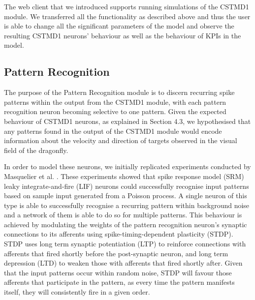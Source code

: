 \documentclass[a4paper,11pt]{article}
\begin{document}
The web client that we introduced supports running simulations of the CSTMD1 module. We transferred all the functionality as described above and thus the user is able to change all the significant parameters of the model and observe the resulting CSTMD1 neurons' behaviour as well as the behaviour of KPIs in the model.

\subsection{Pattern Recognition}

The purpose of the Pattern Recognition module is to discern recurring spike patterns within the output from the CSTMD1 module, with each pattern recognition neuron becoming selective to one pattern. Given the expected behaviour of CSTMD1 neurons, as explained in Section 4.3, we hypothesised that any patterns found in the output of the CSTMD1 module would encode information about the velocity and direction of targets observed in the visual field of the dragonfly.\par

	In order to model these neurons, we initially replicated experiments conducted by Masquelier et al. \cite{stdp2} \cite{stdp1}. These experiments showed that spike response model (SRM) leaky integrate-and-fire (LIF) neurons could successfully recognise input patterns based on sample input generated from a Poisson process. A single neuron of this type is able to successfully recognise a recurring pattern within background noise and a network of them is able to do so for multiple patterns. This behaviour is achieved by modulating the weights of the pattern recognition neuron's synaptic connections to its afferents using spike-timing-dependent plasticity (STDP). STDP uses long term synaptic potentiation (LTP) to reinforce connections with afferents that fired shortly before the post-synaptic neuron, and long term depression (LTD) to weaken those with afferents that fired shortly after. Given that the input patterns occur within random noise, STDP will favour those afferents that participate in the pattern, as every time the pattern manifests itself, they will consistently fire in a given order.
	
\end{document}
